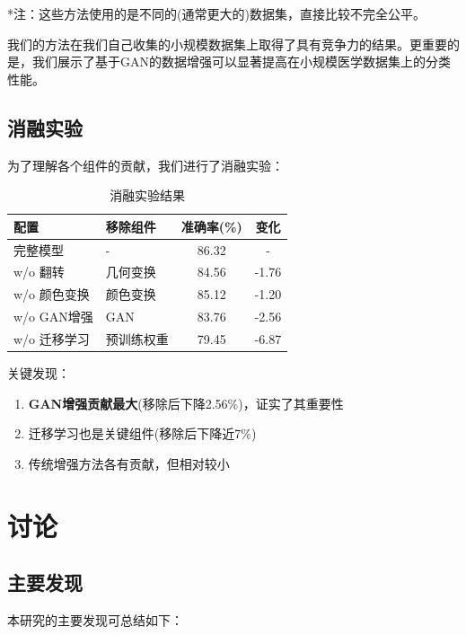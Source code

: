 \documentclass[supercite]{../Hust-undergraduate-translation/Experimental_Report}
\theoremstyle{definition}
\begin{document}
*注：这些方法使用的是不同的(通常更大的)数据集，直接比较不完全公平。

我们的方法在我们自己收集的小规模数据集上取得了具有竞争力的结果。更重要的是，我们展示了基于GAN的数据增强可以显著提高在小规模医学数据集上的分类性能。

\subsection{消融实验}

为了理解各个组件的贡献，我们进行了消融实验：

\begin{table}[htbp]
\centering
\caption{消融实验结果}
\label{tbl:ablation}
\begin{tabular}{|l|l|c|c|}
\hline
配置 & 移除组件 & 准确率(\%) & 变化 \\
\hline
完整模型 & - & 86.32 & - \\
\hline
w/o 翻转 & 几何变换 & 84.56 & -1.76 \\
\hline
w/o 颜色变换 & 颜色变换 & 85.12 & -1.20 \\
\hline
w/o GAN增强 & GAN & 83.76 & -2.56 \\
\hline
w/o 迁移学习 & 预训练权重 & 79.45 & -6.87 \\
\hline
\end{tabular}
\end{table}

关键发现：
\begin{enumerate}
\item \textbf{GAN增强贡献最大}(移除后下降2.56\%)，证实了其重要性
\item 迁移学习也是关键组件(移除后下降近7\%)
\item 传统增强方法各有贡献，但相对较小
\end{enumerate}

\section{讨论}

\subsection{主要发现}

本研究的主要发现可总结如下：
\end{document}
